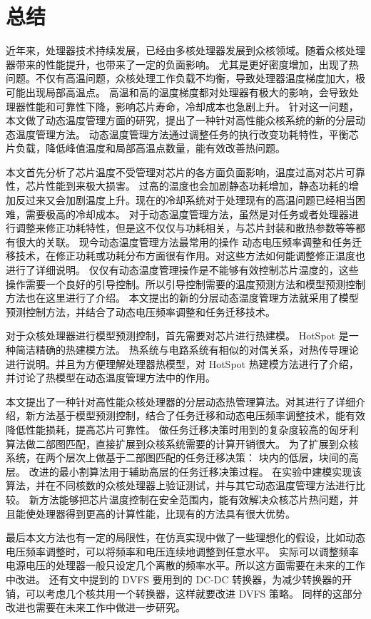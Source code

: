
\chapter{总结}

近年来，处理器技术持续发展，已经由多核处理器发展到众核领域。随着众核处理器带来的性能提升，也带来了一定的负面影响。
尤其是更好密度增加，出现了热问题。不仅有高温问题，众核处理工作负载不均衡，导致处理器温度梯度加大，极可能出现局部高温点。
高温和高的温度梯度都对处理器有极大的影响，会导致处理器性能和可靠性下降，影响芯片寿命，冷却成本也急剧上升。
针对这一问题，本文做了动态温度管理方面的研究，提出了一种针对高性能众核系统的新的分层动态温度管理方法。
动态温度管理方法通过调整任务的执行改变功耗特性，平衡芯片负载，降低峰值温度和局部高温点数量，能有效改善热问题。

本文首先分析了芯片温度不受管理对芯片的各方面负面影响，温度过高对芯片可靠性，芯片性能到来极大损害。
过高的温度也会加剧静态功耗增加，静态功耗的增加反过来又会加剧温度上升。现在的冷却系统对于处理现有的高温问题已经相当困难，需要极高的冷却成本。
对于动态温度管理方法，虽然是对任务或者处理器进行调整来修正功耗特性，但是这不仅仅与功耗相关，与芯片封装和散热参数等等都有很大的关联。
现今动态温度管理方法最常用的操作 动态电压频率调整和任务迁移技术，在修正功耗或功耗分布方面很有作用。对这些方法如何能调整修正温度也进行了详细说明。
仅仅有动态温度管理操作是不能够有效控制芯片温度的，这些操作需要一个良好的引导控制。所以引导控制需要的温度预测方法和模型预测控制方法也在这里进行了介绍。
本文提出的新的分层动态温度管理方法就采用了模型预测控制方法，并结合了动态电压频率调整和任务迁移技术。

对于众核处理器进行模型预测控制，首先需要对芯片进行热建模。 HotSpot 是一种简洁精确的热建模方法。
热系统与电路系统有相似的对偶关系，对热传导理论进行说明。并且为方便理解处理器热模型，对 HotSpot 热建模方法进行了介绍，
并讨论了热模型在动态温度管理方法中的作用。

本文提出了一种针对高性能众核处理器的分层动态热管理算法。对其进行了详细介绍，新方法基于模型预测控制，结合了任务迁移和动态电压频率调整技术，能有效降低性能损耗，提高芯片可靠性。
做任务迁移决策时用到的复杂度较高的匈牙利算法做二部图匹配，直接扩展到众核系统需要的计算开销很大。
为了扩展到众核系统，在两个层次上做基于二部图匹配的任务迁移决策：
块内的低层，块间的高层。
改进的最小割算法用于辅助高层的任务迁移决策过程。
在实验中建模实现该算法，并在不同核数的众核处理器上验证测试，并与其它动态温度管理方法进行比较。
新方法能够把芯片温度控制在安全范围内，能有效解决众核芯片热问题，并且能使处理器得到更高的计算性能，比现有的方法具有很大优势。

最后本文方法也有一定的局限性，在仿真实现中做了一些理想化的假设，比如动态电压频率调整时，可以将频率和电压连续地调整到任意水平。
实际可以调整频率电源电压的处理器一般只设定几个离散的频率水平。所以这方面需要在未来的工作中改进。
还有文中提到的 DVFS 要用到的 DC-DC 转换器，为减少转换器的开销，可以考虑几个核共用一个转换器，这样就要改进 DVFS 策略。
同样的这部分改进也需要在未来工作中做进一步研究。






























